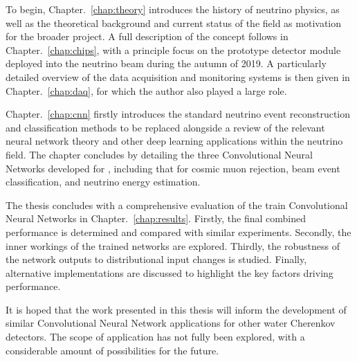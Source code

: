 To begin, Chapter.~\ref{chap:theory} introduces the history of neutrino physics, as well as the
theoretical background and current status of the field as motivation for the broader \chips
project. A full description of the \chips concept follows in Chapter.~\ref{chap:chips}, with a
principle focus on the \chipsfive prototype detector module deployed into the \numi neutrino beam
during the autumn of 2019. A particularly detailed overview of the \chipsfive data acquisition and
monitoring systems is then given in Chapter.~\ref{chap:daq}, for which the author also played a
large role.

Chapter.~\ref{chap:cnn} firstly introduces the standard neutrino event reconstruction and
classification methods to be replaced alongside a review of the relevant neural network theory and
other deep learning applications within the neutrino field. The chapter concludes by detailing the
three Convolutional Neural Networks developed for \chipsfive, including that for cosmic muon
rejection, beam event classification, and neutrino energy estimation.

The thesis concludes with a comprehensive evaluation of the train Convolutional Neural Networks in
Chapter.~\ref{chap:results}. Firstly, the final combined performance is determined and compared
with similar experiments. Secondly, the inner workings of the trained networks are explored.
Thirdly, the robustness of the network outputs to distributional input changes is studied.
Finally, alternative implementations are discussed to highlight the key factors driving
performance.

It is hoped that the work presented in this thesis will inform the development of similar
Convolutional Neural Network applications for other water Cherenkov detectors. The scope of
application has not fully been explored, with a considerable amount of possibilities for the
future. 
